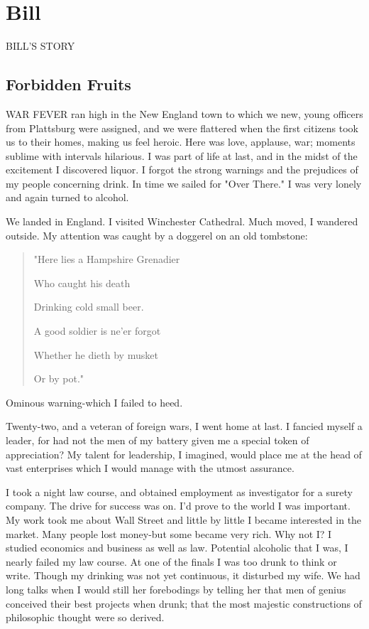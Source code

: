 
\section{Bill}

BILL'S STORY

\subsection{Forbidden Fruits}


WAR FEVER ran high in the New England town to which we new, young officers from Plattsburg were assigned, and we were flattered when the first citizens took us to their homes, making us feel heroic.
Here was love, applause, war; moments sublime with intervals hilarious.
I was part of life at last, and in the midst of the excitement I discovered liquor.
I forgot the strong warnings and the prejudices of my people concerning drink.
In time we sailed for "Over There."
I was very lonely and again turned to alcohol.

We landed in England.
I visited Winchester Cathedral.
Much moved, I wandered outside.
My attention was caught by a doggerel on an old tombstone:

\begin{quote}
"Here lies a Hampshire Grenadier

Who caught his death

Drinking cold small beer.

A good soldier is ne'er forgot

Whether he dieth by musket

Or by pot."
\end{quote}

Ominous warning-which I failed to heed.

Twenty-two, and a veteran of foreign wars, I went home at last.
I fancied myself a leader, for had not the men of my battery given me a special token of appreciation?
My talent for leadership, I imagined, would place me at the head of vast enterprises which I would manage with the utmost assurance.

I took a night law course, and obtained employment as investigator for a surety company.
The drive for success was on.
I'd prove to the world I was important.
My work took me about Wall Street and little by little I became interested in the market.
Many people lost money-but some became very rich.
Why not I?
I studied economics and business as well as law.
Potential  alcoholic that I was, I nearly failed my law course.
At one of the finals I was too drunk to think or write.
Though my drinking was not yet continuous, it disturbed my wife.
We had long talks when I would still her forebodings by telling her that men of genius conceived their best projects when drunk; that the most majestic constructions of philosophic thought were so derived.

